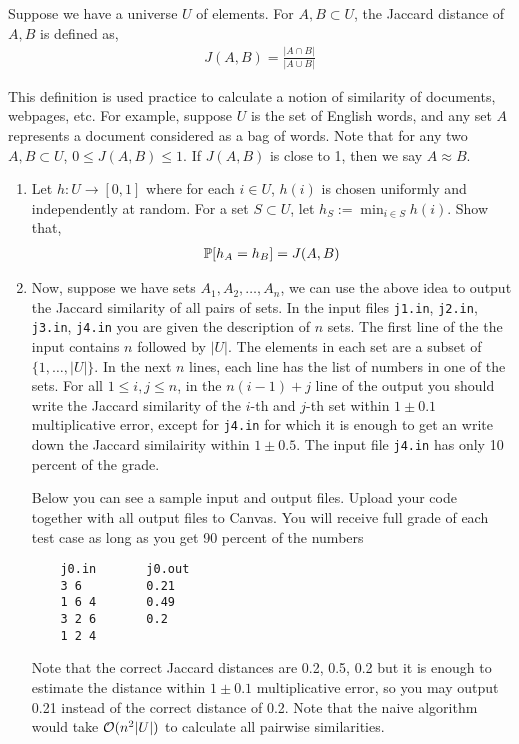 \documentclass[10pt]{article}
\begin{document}
\maketitle

\begin{problem}[Problem 1]
Suppose we have a universe \( U \) of elements. For \( A,B\subset U \), the Jaccard distance of \( A,B \) is defined as,
\begin{align*}
    J(A,B) = \frac{|A\cap B|}{|A\cup B|}
\end{align*}

This definition is used practice to calculate a notion of similarity of documents, webpages, etc. For
    example, suppose \( U \) is the set of English words, and any set \( A \) represents a document considered as a bag of words. Note that for any two \( A,B\subset U \), \( 0\leq J(A,B) \leq 1 \). If \( J(A,B) \) is close to 1, then we say \( A\approx B \).
    \begin{enumerate}[label=(\alph*),nolistsep]
        \item Let \( h:U\to[0,1] \) where for each \( i \in U \), \( h(i) \) is chosen uniformly and independently at random. For a set \( S \subset U \), let \( h_S := \min_{i\in S} h(i) \). Show that,
            \begin{align*}
                \mathbb{P}[h_A = h_B ] = J(A,B)
            \end{align*}
        \item Now, suppose we have sets \( A_1, A_2, \ldots, A_n \), we can use the above idea to output the Jaccard similarity of all pairs of sets. In the input files {\tt j1.in}, {\tt j2.in}, {\tt j3.in}, {\tt j4.in} you are given the description of \( n \) sets. The first line of the the input contains \( n \) followed by \( |U| \). The elements in each set are a subset of \( \{1, \ldots , |U|\} \). In the next \( n \) lines, each line has the list of numbers in one of the sets. For all \(  1 \leq i, j \leq n \), in the \( n(i - 1) + j \) line of the output you should write the Jaccard similarity of the \( i \)-th and \( j \)-th set within \( 1 \pm 0.1 \) multiplicative error, except for {\tt j4.in} for which it is enough to get an write down the Jaccard similairity within \( 1 \pm 0.5\). The input file {\tt j4.in} has only 10 percent of the grade.

            Below you can see a sample input and output files. Upload your code together with all output files
to Canvas. You will receive full grade of each test case as long as you get 90 percent of the numbers

\begin{lstlisting}
    j0.in       j0.out
    3 6         0.21
    1 6 4       0.49
    3 2 6       0.2
    1 2 4
\end{lstlisting}


Note that the correct Jaccard distances are 0.2, 0.5, 0.2 but it is enough to estimate the distance within \( 1 \pm 0.1 \) multiplicative error, so you may output 0.21 instead of the correct distance of 0.2.
Note that the naive algorithm would take \( \mathcal{O}(n^2|U|) \) to calculate all pairwise similarities.
    \end{enumerate}
\end{problem}
\end{document}
